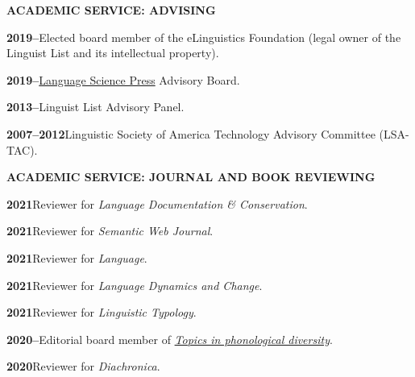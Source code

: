 \documentclass[11pt]{article}
\newcommand{\hangpara}{
 \setlength{\parindent}{0in} %
 \hangindent=0.42in %
}
\begin{document}
\vskip 20pt
\begin{flushleft}
{\bf ACADEMIC SERVICE: ADVISING}
\end{flushleft}

\hangpara
{\bf 2019--}\hspace{1ex}Elected board member of the eLinguistics Foundation (legal owner of the Linguist List and its intellectual property).

\vskip 6pt
\hangpara
{\bf 2019--}\hspace{1ex}\href{https://langsci-press.org/}{Language Science Press} Advisory Board.

\vskip 6pt
\hangpara
{\bf 2013--}\hspace{1ex}Linguist List Advisory Panel.

\vskip 6pt
\hangpara
{\bf 2007--2012}\hspace{1ex}Linguistic Society of America Technology Advisory Committee (LSA-TAC).


\vskip 20pt
\begin{flushleft}
{\bf ACADEMIC SERVICE: JOURNAL AND BOOK REVIEWING}
\end{flushleft}


\hangpara
{\bf 2021}\hspace{1ex}Reviewer for \textit{Language Documentation \& Conservation}.

\vskip 6pt
\hangpara
{\bf 2021}\hspace{1ex}Reviewer for \textit{Semantic Web Journal}.

\hangpara
\vskip 6pt
{\bf 2021}\hspace{1ex}Reviewer for \textit{Language}.

\vskip 6pt
\hangpara
{\bf 2021}\hspace{1ex}Reviewer for \textit{Language Dynamics and Change}.

\vskip 6pt
\hangpara
{\bf 2021}\hspace{1ex}Reviewer for \textit{Linguistic Typology}.

\vskip 6pt
\hangpara
{\bf 2020--}\hspace{1ex}Editorial board member of \textit{\href{https://langsci-press.org/catalog/series/tpd}{Topics in phonological diversity}}.

\vskip 6pt
\hangpara
{\bf 2020}\hspace{1ex}Reviewer for \textit{Diachronica}.
\end{document}
